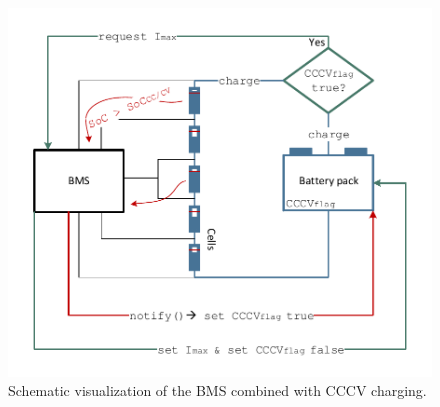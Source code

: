 \begin{figure}[t!]
	\captionsetup{type=figure}
	\centering
	\includegraphics[width=\textwidth]{cccvBMS}
	\caption[Schematic visualization of the BMS combined with CCCV charging]{Schematic visualization of the BMS combined with CCCV charging.}
	\label{fig:cccvBMS}
\end{figure}

